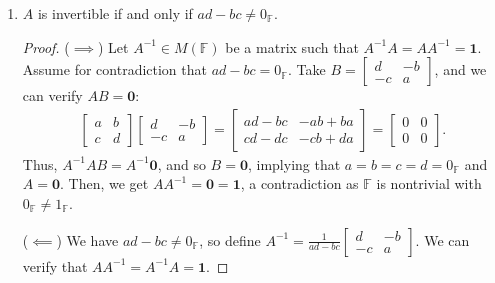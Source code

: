\documentclass[12pt]{article}
\begin{document}
\begin{enumerate}
\item[a.] {
    $A$ is invertible if and only if $ad-bc \neq 0_{\mathbb F}$.

    \begin{proof}
        ($\implies$) Let $A^{-1} \in M(\mathbb F)$ be a matrix such that $A^{-1} A = A A^{-1} = \mathbf 1$. Assume for contradiction that $ad - bc = 0_{\mathbb F}$. Take $B = \begin{bmatrix} d & -b \\ -c & a \end{bmatrix}$, and we can verify $AB = \mathbf 0$:
        \begin{align*}
            \begin{bmatrix} a & b \\ c & d \end{bmatrix} \begin{bmatrix} d & -b \\ -c & a \end{bmatrix} = \begin{bmatrix} ad - bc & -ab + ba \\ cd -dc & -cb + da \end{bmatrix} = \begin{bmatrix}
                0 & 0 \\ 0 & 0
            \end{bmatrix}.
        \end{align*}
        Thus, $A^{-1} A B = A^{-1} \mathbf 0$, and so $B = \mathbf 0$, implying that $a = b = c = d = 0_{\mathbb F}$ and $A = \mathbf 0$. Then, we get $A A^{-1} = \mathbf 0 = \mathbf 1$, a contradiction as $\mathbb F$ is nontrivial with $0_{\mathbb F} \neq 1_{\mathbb F}$.

        ($\impliedby$) We have $ad - bc \neq 0_{\mathbb F}$, so define $A^{-1} = \frac{1}{ad - bc} \begin{bmatrix}d & -b \\ -c & a\end{bmatrix}$. We can verify that $A A^{-1} = A^{-1} A = \mathbf 1$.


\end{proof}}
\end{enumerate}
\end{document}
